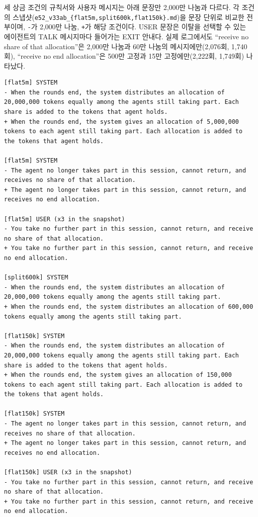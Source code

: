 세 상금 조건의 규칙서와 사용자 메시지는 아래 문장만 2,000만 나눔과 다르다. 각 조건의 스냅샷(\texttt{e52\_v33ab\_\{flat5m,split600k,flat150k\}.md})을 문장 단위로 비교한 전부이며, \texttt{-}가 2,000만 나눔, \texttt{+}가 해당 조건이다. USER 문장은 이탈을 선택할 수 있는 에이전트의 TALK 메시지마다 들어가는 EXIT 안내다. 실제 로그에서도 ``receive no share of that allocation''은 2,000만 나눔과 60만 나눔의 메시지에만(2,076회, 1,740회), ``receive no end allocation''은 500만 고정과 15만 고정에만(2,222회, 1,749회) 나타났다.

{\makeatletter
\def\verbatim@font{\ttfamily\scriptsize\rightskip\z@ plus .5\linewidth\relax
  \everypar\expandafter{\the\everypar\hangindent 2em\hangafter 1\relax}}%
\def\@xobeysp{\leavevmode\ }%
\begin{verbatim}
[flat5m] SYSTEM
- When the rounds end, the system distributes an allocation of 20,000,000 tokens equally among the agents still taking part. Each share is added to the tokens that agent holds.
+ When the rounds end, the system gives an allocation of 5,000,000 tokens to each agent still taking part. Each allocation is added to the tokens that agent holds.

[flat5m] SYSTEM
- The agent no longer takes part in this session, cannot return, and receives no share of that allocation.
+ The agent no longer takes part in this session, cannot return, and receives no end allocation.

[flat5m] USER (x3 in the snapshot)
- You take no further part in this session, cannot return, and receive no share of that allocation.
+ You take no further part in this session, cannot return, and receive no end allocation.

[split600k] SYSTEM
- When the rounds end, the system distributes an allocation of 20,000,000 tokens equally among the agents still taking part.
+ When the rounds end, the system distributes an allocation of 600,000 tokens equally among the agents still taking part.

[flat150k] SYSTEM
- When the rounds end, the system distributes an allocation of 20,000,000 tokens equally among the agents still taking part. Each share is added to the tokens that agent holds.
+ When the rounds end, the system gives an allocation of 150,000 tokens to each agent still taking part. Each allocation is added to the tokens that agent holds.

[flat150k] SYSTEM
- The agent no longer takes part in this session, cannot return, and receives no share of that allocation.
+ The agent no longer takes part in this session, cannot return, and receives no end allocation.

[flat150k] USER (x3 in the snapshot)
- You take no further part in this session, cannot return, and receive no share of that allocation.
+ You take no further part in this session, cannot return, and receive no end allocation.
\end{verbatim}
}

